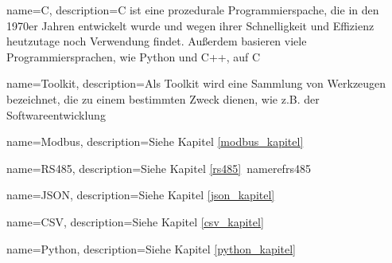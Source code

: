 {
	name=C,
	description={C ist eine prozedurale Programmierspache, die in den 1970er Jahren entwickelt wurde und wegen ihrer Schnelligkeit und Effizienz heutzutage noch Verwendung findet. Außerdem basieren viele Programmiersprachen, wie \zB Python und C++, auf C}
}

{
	name=Toolkit,
	description={Als Toolkit wird eine Sammlung von Werkzeugen bezeichnet, die zu einem bestimmten Zweck dienen, wie z.B. der Softwareentwicklung}
}

{
	name=Modbus,
	description={Siehe Kapitel \ref{modbus_kapitel} }
}

{
	name=RS485,
	description={Siehe Kapitel \ref{rs485}\ nameref{rs485}}
}

{
	name=JSON,
	description={Siehe Kapitel \ref{json_kapitel} }
}

{
	name=CSV,
	description={Siehe Kapitel \ref{csv_kapitel} }
}

{
	name=Python,
	description={Siehe Kapitel \ref{python_kapitel} }
}